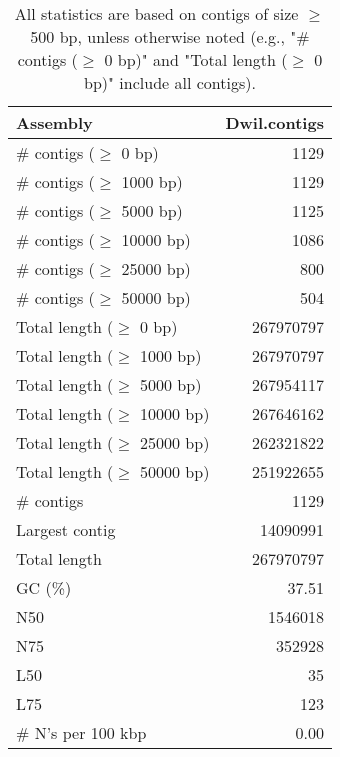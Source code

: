 \documentclass[12pt,a4paper]{article}
\begin{document}
\begin{table}[ht]
\begin{center}
\caption{All statistics are based on contigs of size $\geq$ 500 bp, unless otherwise noted (e.g., "\# contigs ($\geq$ 0 bp)" and "Total length ($\geq$ 0 bp)" include all contigs).}
\begin{tabular}{|l*{1}{|r}|}
\hline
Assembly & Dwil.contigs \\ \hline
\# contigs ($\geq$ 0 bp) & 1129 \\ \hline
\# contigs ($\geq$ 1000 bp) & 1129 \\ \hline
\# contigs ($\geq$ 5000 bp) & 1125 \\ \hline
\# contigs ($\geq$ 10000 bp) & 1086 \\ \hline
\# contigs ($\geq$ 25000 bp) & 800 \\ \hline
\# contigs ($\geq$ 50000 bp) & 504 \\ \hline
Total length ($\geq$ 0 bp) & 267970797 \\ \hline
Total length ($\geq$ 1000 bp) & 267970797 \\ \hline
Total length ($\geq$ 5000 bp) & 267954117 \\ \hline
Total length ($\geq$ 10000 bp) & 267646162 \\ \hline
Total length ($\geq$ 25000 bp) & 262321822 \\ \hline
Total length ($\geq$ 50000 bp) & 251922655 \\ \hline
\# contigs & 1129 \\ \hline
Largest contig & 14090991 \\ \hline
Total length & 267970797 \\ \hline
GC (\%) & 37.51 \\ \hline
N50 & 1546018 \\ \hline
N75 & 352928 \\ \hline
L50 & 35 \\ \hline
L75 & 123 \\ \hline
\# N's per 100 kbp & 0.00 \\ \hline
\end{tabular}
\end{center}
\end{table}
\end{document}
